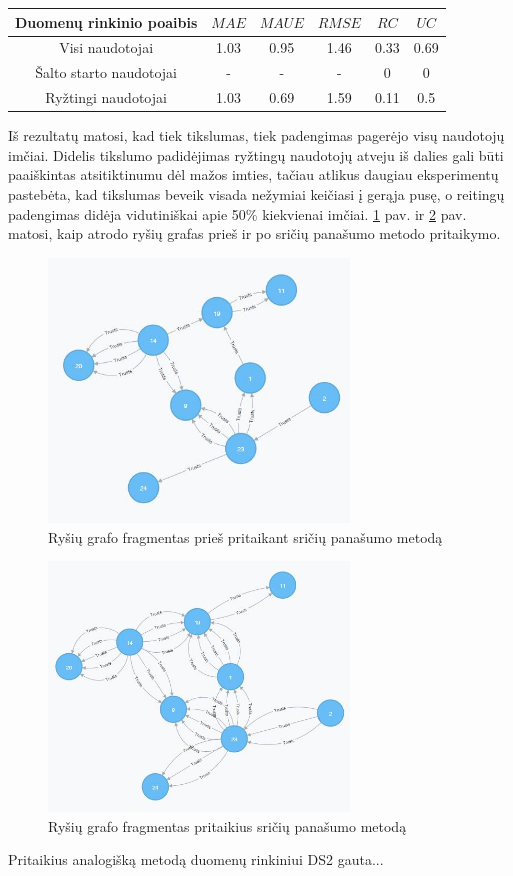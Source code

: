 \documentclass{VUMIFInfMagistrinis}
\begin{document}
\begin{center}
	\begin{tabular}{||c c c c c c ||} 
		Duomenų rinkinio poaibis  & $MAE$ & $MAUE$ & $RMSE$ & $RC$ & $UC$ \\
		\hline
		Visi naudotojai & 1.03 & 0.95 & 1.46 & 0.33 & 0.69 \\
		\hline
		Šalto starto naudotojai & - & - & - & 0 & 0 \\
		\hline
		Ryžtingi naudotojai & 1.03 & 0.69 & 1.59 & 0.11 & 0.5 \\
	\end{tabular}
\end{center}
\indent
Iš rezultatų matosi, kad tiek tikslumas, tiek padengimas pagerėjo visų naudotojų imčiai. Didelis tikslumo padidėjimas ryžtingų naudotojų atveju iš dalies gali būti paaiškintas atsitiktinumu dėl mažos imties, tačiau atlikus daugiau eksperimentų pastebėta, kad tikslumas beveik visada nežymiai keičiasi į gerąja pusę, o reitingų padengimas didėja vidutiniškai apie 50\% kiekvienai imčiai.  \ref{beforeDS} pav. ir \ref{afterDS} pav. matosi, kaip atrodo ryšių grafas prieš ir po sričių panašumo metodo pritaikymo.
\begin{figure}[ht!]
	\centering
	\includegraphics[width=80mm]{img/beforeDS.jpg}
	\caption{Ryšių grafo fragmentas prieš pritaikant sričių panašumo metodą} \label{beforeDS}
\end{figure}
\begin{figure}[ht!]
	\centering
	\includegraphics[width=80mm]{img/afterDS.jpg}
	\caption{Ryšių grafo fragmentas pritaikius sričių panašumo metodą} \label{afterDS}
\end{figure}
\newline
\indent
Pritaikius analogišką metodą duomenų rinkiniui DS2 gauta...
\end{document}
